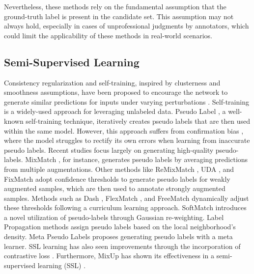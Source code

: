 Nevertheless, these methods rely on the fundamental assumption that the ground-truth label is present in the candidate set. This assumption may not always hold, especially in cases of unprofessional judgments by annotators, which could limit the applicability of these methods in real-world scenarios.








\subsection{Semi-Supervised Learning}

Consistency regularization and self-training, inspired by clusterness and smoothness assumptions, have been proposed to encourage the network to generate similar predictions for inputs under varying perturbations \citep{tarvainen2017mean,samuli2017temporal,miyato2018virtual}. Self-training \citep{lee2013pseudo,arazo2020pseudo,sohn2020fixmatch} is a widely-used approach for leveraging unlabeled data.
Pseudo Label \citep{lee2013pseudo}, a well-known self-training technique, iteratively creates pseudo labels that are then used within the same model. However, this approach suffers from confirmation bias \citep{arazo2020pseudo}, where the model struggles to rectify its own errors when learning from inaccurate pseudo labels.
Recent studies focus largely on generating high-quality pseudo-labels. MixMatch \citep{berthelot2019mixmatch}, for instance, generates pseudo labels by averaging predictions from multiple augmentations. Other methods like ReMixMatch \citep{berthelot2019remixmatch}, UDA \citep{xie2020unsupervised}, and FixMatch \citep{sohn2020fixmatch} adopt confidence thresholds to generate pseudo labels for weakly augmented samples, which are then used to annotate strongly augmented samples.
Methods such as Dash \citep{xu2021dash}, FlexMatch \citep{zhang2021flexmatch}, and FreeMatch \citep{wang2023freematch} dynamically adjust these thresholds following a curriculum learning approach. SoftMatch \citep{chen2023softmatch} introduces a novel utilization of pseudo-labels through Gaussian re-weighting.
Label Propagation methods \citep{iscen2019label} assign pseudo labels based on the local neighborhood's density. 
Meta Pseudo Labels \citep{pham2021meta} proposes generating pseudo labels with a meta learner.
SSL learning has also seen improvements through the incorporation of contrastive loss \citep{li2021comatch,zheng2022simmatch}. Furthermore, MixUp \citep{zhang2017mixup} has shown its effectiveness in a semi-supervised learning (SSL) \citep{berthelot2019mixmatch,berthelot2019remixmatch,cai2022semivit}.


